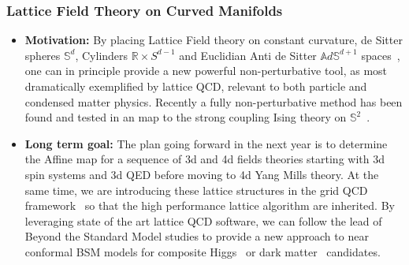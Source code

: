 \documentclass[12pt,hyperpdf]{article}
\begin{document}
\subsubsection{Lattice Field Theory on Curved Manifolds}
\begin{itemize}
   \item{ \bf Motivation:}
 By placing Lattice Field theory on constant curvature, de Sitter spheres
${\mathbb S}^d$, Cylinders ${ \mathbb R} \times S^{d-1}$ and Euclidian Anti de Sitter
${\mathbb A}d\mathbb{S}^{d+1}$ spaces~\cite{Brower:2019kyh,Brower:2020jqj, Cogburn:2022yyb}, one can
in principle provide a new powerful non-perturbative tool, as
most dramatically exemplified  by lattice QCD, relevant to
both particle and condensed matter physics.  
Recently a fully non-perturbative method has been
found and tested in an map to the strong coupling Ising theory on
${ \mathbb S}^2$~\cite{Brower:2022cwv,Owen:2023}. 
 \item { \bf Long term goal:}
The plan going forward in the next year is to determine the Affine map
for a sequence of 3d and 4d fields theories starting with 3d spin systems and 3d QED before moving to 4d Yang Mills theory. At the same time, we are
introducing these lattice structures in the grid QCD
framework~\cite{Boyle:2016lbp} so that the high performance lattice
algorithm are inherited.  By leveraging state of the art lattice QCD
software, we can follow the lead of Beyond the Standard Model studies
to provide a new approach to near conformal BSM models for composite
Higgs~\cite{LSD:2023uzj} or dark matter~\cite{LatticeStrongDynamics:2020jwi} candidates.  
\end{itemize}

\newpage



%

%
%

\end{document}
